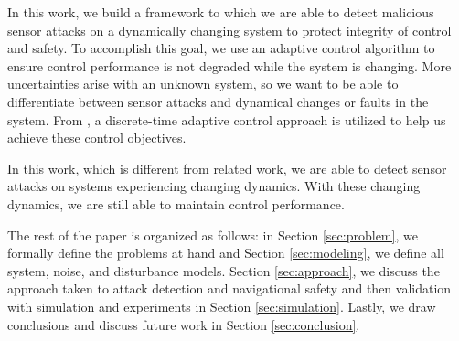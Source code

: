 In this work, we build a framework to which we are able to detect malicious sensor attacks on a dynamically changing system to protect integrity of control and safety. To accomplish this goal, we use an adaptive control algorithm to ensure control performance is not degraded while the system is changing. More uncertainties arise with an unknown system, so we want to be able to differentiate between sensor attacks and dynamical changes or faults in the system. From \cite{tao2003adaptive,Goodwin:2009:AFP:1643720}, a  discrete-time adaptive control approach is utilized to help us achieve these control objectives.

In this work, which is different from related work, we are able to detect sensor attacks on systems experiencing changing dynamics. With these changing dynamics, we are still able to maintain control performance.

The rest of the paper is organized as follows: in Section \ref{sec:problem}, we formally define the problems at hand and Section \ref{sec:modeling}, we define all system, noise, and disturbance models. Section \ref{sec:approach}, we discuss the approach taken to attack detection and navigational safety and then validation with simulation and experiments in Section \ref{sec:simulation}. Lastly, we draw conclusions and discuss future work in Section \ref{sec:conclusion}.

